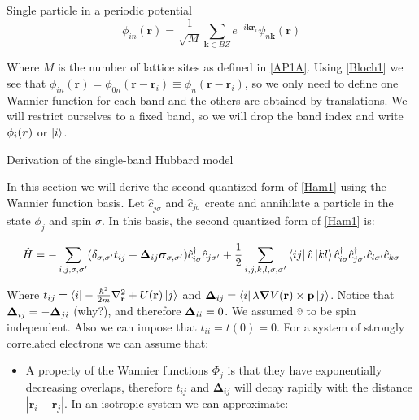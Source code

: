\begin{section}{Single particle in a periodic potential}
\begin{equation}
\phi_{in}(\textbf{r}) = \frac{1}{\sqrt{M}}\sum_{\textbf{k}\in BZ} e^{-i\textbf{k}\textbf{r}_i} \psi_{n\textbf{k}}(\textbf{r})
\end{equation}

Where $M$ is the number of lattice sites as defined in \ref{AP1A}. Using \ref{Bloch1} we see that $\phi_{in}(\textbf{r}) = \phi_{0n}(\textbf{r}-\textbf{r}_i) \equiv \phi_{n}(\textbf{r}-\textbf{r}_i)$, so we only need to define one Wannier function for each band and the others are obtained by translations. We will restrict ourselves to a fixed band, so we will drop the band index and write $\phi_i(\boldsymbol{r})$ or $\ket{i}$.

\end{section}

\begin{section}{Derivation of the single-band Hubbard model}

In this section we will derive the second quantized form of \ref{Ham1} using the Wannier function basis. Let $\hat{c}_{j \sigma}^\dagger$ and $\hat{c}_{j \sigma}$ create and annihilate a particle in the state $\phi_j$ and spin $\sigma$. In this basis, the second quantized form of \ref{Ham1} is:

\begin{equation}
\hat{H} = -\sum_{i,j,\sigma, \sigma'} (\delta_{\sigma, \sigma'} t_{ij} + \boldsymbol{\Delta}_{ij} \boldsymbol{\sigma}_{\sigma, \sigma'}) \hat{c}_{i \sigma}^\dagger \hat{c}_{j \sigma'} + \frac{1}{2} \sum_{i,j,k,l, \sigma, \sigma'} \bra{ij} \hat{v} \ket{kl} \hat{c}_{i \sigma}^\dagger \hat{c}_{j \sigma'}^\dagger \hat{c}_{l \sigma'} \hat{c}_{k \sigma}
\end{equation}

Where $t_{ij} = \bra{i} -\frac{\hbar^2}{2m}\nabla^2_{\textbf{r}} + U(\textbf{r}) \ket{j}$ and $\boldsymbol{\Delta}_{ij} = \bra{i} \lambda \boldsymbol{\nabla}V(\textbf{r}) \times \textbf{p} \ket{j}$. Notice that $\boldsymbol{\Delta}_{ij} = - \boldsymbol{\Delta}_{ji}$ (why?), and therefore $\boldsymbol{\Delta}_{ii} = 0$. We assumed $\hat{v}$ to be spin independent. Also we can impose that $t_{ii} = t(0) = 0$. For a system of strongly correlated electrons we can assume that:

\begin{itemize}
\item A property of the Wannier functions $\Phi_j$ is that they have exponentially decreasing overlaps, therefore $t_{ij}$ and $\boldsymbol{\Delta}_{ij}$ will decay rapidly with the distance $|\textbf{r}_i-\textbf{r}_j|$. In an isotropic system we can approximate:


\end{itemize}
\end{section}
